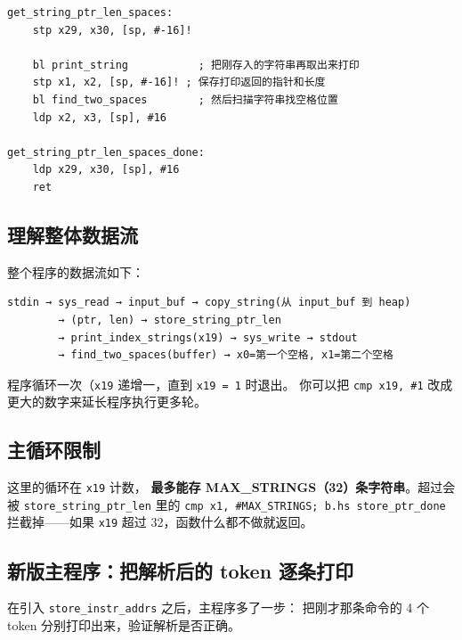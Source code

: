 \begin{lstlisting}[style=asm,caption=hello.s — 打印+解析]
get_string_ptr_len_spaces:
    stp x29, x30, [sp, #-16]!

    bl print_string           ; 把刚存入的字符串再取出来打印
    stp x1, x2, [sp, #-16]! ; 保存打印返回的指针和长度
    bl find_two_spaces        ; 然后扫描字符串找空格位置
    ldp x2, x3, [sp], #16

get_string_ptr_len_spaces_done:
    ldp x29, x30, [sp], #16
    ret
\end{lstlisting}

\subsection{理解整体数据流}

整个程序的数据流如下：

\begin{verbatim}
stdin → sys_read → input_buf → copy_string(从 input_buf 到 heap)
        → (ptr, len) → store_string_ptr_len
        → print_index_strings(x19) → sys_write → stdout
        → find_two_spaces(buffer) → x0=第一个空格, x1=第二个空格
\end{verbatim}

程序循环一次（\texttt{x19} 递增一，直到 \texttt{x19 = 1} 时退出。
你可以把 \texttt{cmp x19, \#1} 改成更大的数字来延长程序执行更多轮。

\subsection{主循环限制}

这里的循环在 \texttt{x19} 计数，
\textbf{最多能存 MAX\_STRINGS（32）条字符串}。超过会被
\texttt{store\_string\_ptr\_len} 里的 \texttt{cmp x1, \#MAX\_STRINGS; b.hs store\_ptr\_done} 拦截掉——如果 \texttt{x19} 超过 32，函数什么都不做就返回。

\subsection{新版主程序：把解析后的 token 逐条打印}

在引入 \texttt{store\_instr\_addrs} 之后，主程序多了一步：
把刚才那条命令的 4 个 token 分别打印出来，验证解析是否正确。

